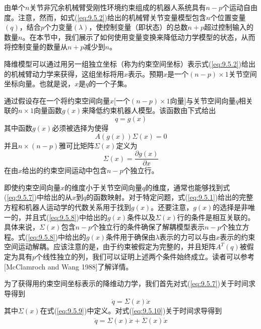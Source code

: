 \documentclass[12pt,a4paper]{ctexart}
\begin{document}
由单个$n$关节非冗余机械臂受刚性环境约束组成的机器人系统具有$n - p$个运动自由度。注意，然而，如式(\ref{eq:9.5.2})给出的机械臂关节变量模型包含$n$个位置变量$(q)$，结合$p$个力变量$(\lambda)$，使控制变量（即状态）的总数$n + p$超过控制输入的数量$n$。在本节中，我们展示了如何使用变量变换来降低动力学模型的状态，从而将控制变量的数量从$n + p$减少到$n$。

降维模型可以通过用另一组独立坐标（称为约束空间坐标）表示式(\ref{eq:9.5.2})给出的机械臂动力学来获得，这组坐标将用$x$表示。预期$x$是一个$(n - p) \times 1$关节空间坐标向量。也就是说，$x$是$q$的一个子集。

通过假设存在一个将约束空间向量$x$[一个$(n - p) \times 1$向量]与关节空间向量$q$相关联的$n \times 1$向量函数$g(x)$来降低约束机器人模型。该函数由下式给出
\begin{equation}\label{eq:9.5.7}
q = g(x)
\end{equation}
其中函数$g(x)$必须被选择为使得
\begin{equation}\label{eq:9.5.8}
A(g(x))\Sigma(x) = 0
\end{equation}
并且$n \times (n - p)$雅可比矩阵$\Sigma(x)$定义为
\begin{equation}\label{eq:9.5.9}
\Sigma(x) = \frac{\partial g(x)}{\partial x}
\end{equation}
在由$x$给出的约束空间运动中包含$n - p$个独立行。

即使约束空间向量$x$的维度小于关节空间向量$q$的维度，通常也能够找到式(\ref{eq:9.5.7})中给出的从$x$到$q$的函数映射。对于特定问题，式(\ref{eq:9.5.1})给出的完整方程和机器人运动学的代数关系用于找到$g(x)$。还要注意，$g(x)$的选择是非唯一的，并且式(\ref{eq:9.5.8})中给出的$g(x)$条件以及$\Sigma(x)$行的条件是相互关联的。具体来说，$\Sigma(x)$包含$n - p$个独立行的条件确保了解耦模型表示$n - p$个独立方程。式(\ref{eq:9.5.8})中给出的$g(x)$条件用于确保由$\lambda$表示的力可以与由$x$表示的约束空间运动解耦。应该注意的是，由于约束被假定为完整的，并且矩阵$A^T(q)$被假定为具有$p$个线性独立的列，我们可以证明上述两个条件始终成立。读者可以参考[McClamroch and Wang 1988]了解详情。

为了获得用约束空间坐标表示的降维动力学，我们首先对式(\ref{eq:9.5.7})关于时间求导得到
\begin{equation}\label{eq:9.5.10}
\dot{q} = \Sigma(x)\dot{x}
\end{equation}
其中$\Sigma(x)$在式(\ref{eq:9.5.9})中定义。对式(\ref{eq:9.5.10})关于时间求导得到
\begin{equation}\label{eq:9.5.11}
\ddot{q} = \Sigma(x)\ddot{x} + \dot{\Sigma}(x)\dot{x}
\end{equation}
\end{document}
